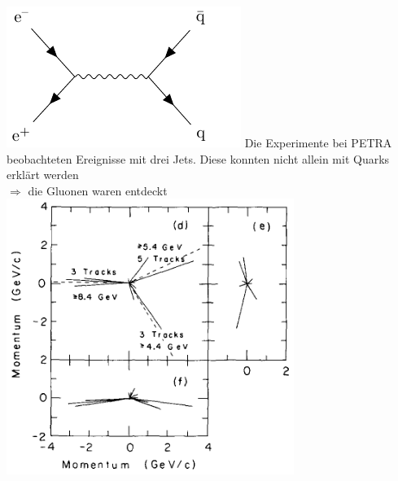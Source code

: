 \documentclass[10pt,t]{beamer}
\begin{document}
\begin{frame}
\begin{columns}
    \includegraphics[width=\textwidth,page=4]{gluon-feynman}
Die Experimente bei PETRA beobachteten Ereignisse mit drei Jets. Diese konnten nicht allein mit Quarks erklärt werden \\
$\Rightarrow$ die Gluonen waren entdeckt \\[1ex]
    \centering\includegraphics[width=0.7\textwidth]{gluon-threejets}
\end{columns}
\vspace*{-18pt}
\end{frame}
\end{document}
